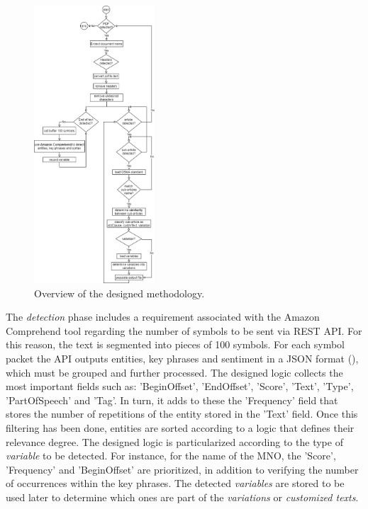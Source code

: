 \documentclass[conference]{style/IEEEtran}
\begin{document}
\begin{figure}[htbp]
\centerline{\includegraphics[width=0.4\textwidth]{images/methodology.png}}
\caption{Overview of the designed methodology.}
\label{fig1}
\end{figure}

The \textit{detection} phase includes a requirement associated with the Amazon Comprehend tool regarding the number of symbols to be sent via REST API. For this reason, the text is segmented into pieces of 100 symbols. For each symbol packet the API outputs entities, key phrases and sentiment in a JSON format (\cite{AWS2021}), which must be grouped and further processed. The designed logic collects the most important fields such as: 'BeginOffset', 'EndOffset', 'Score', 'Text', 'Type', 'PartOfSpeech' and 'Tag'. In turn, it adds to these the 'Frequency' field that stores the number of repetitions of the entity stored in the 'Text' field. Once this filtering has been done, entities are sorted according to a logic that defines their relevance degree. The designed logic is particularized according to the type of \textit{variable} to be detected. For instance, for the name of the MNO, the 'Score', 'Frequency' and 'BeginOffset' are prioritized, in addition to verifying the number of occurrences within the key phrases. The detected \textit{variables} are stored to be used later to determine which ones are part of the \textit{variations} or \textit{customized texts}.
\end{document}
